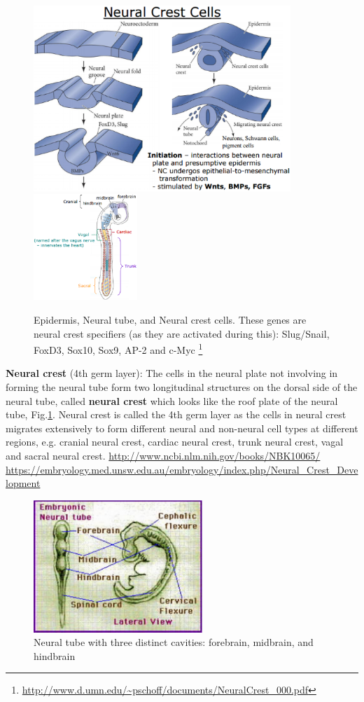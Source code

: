 \begin{figure}[hbt]
  \centerline{
  \includegraphics[height=7cm,
    angle=0]{./images/neural_crest_cells.eps}
  \includegraphics[height=4cm,
    angle=0]{./images/crest_cell_regions.eps}  }
\caption{Epidermis, Neural tube, and Neural crest cells. These genes are neural
crest specifiers (as they are activated during this):
Slug/Snail, FoxD3, Sox10, Sox9, AP-2 and c-Myc
\footnote{\url{http://www.d.umn.edu/~pschoff/documents/NeuralCrest_000.pdf}}}
\label{fig:neural_crest_cells}
\end{figure}

{\bf Neural crest} (4th germ layer): The cells in the neural plate not involving
in forming the neural tube form two longitudinal structures on the dorsal side of the neural
tube, called {\bf neural crest} which looks like the roof plate of the neural
tube, Fig.\ref{fig:neural_crest_cells}.
Neural crest is called the 4th germ layer as the cells in neural crest migrates
extensively to form different neural and non-neural cell types at different
regions, e.g. cranial neural crest, cardiac neural crest, trunk neural crest,
vagal and sacral neural crest.
\url{http://www.ncbi.nlm.nih.gov/books/NBK10065/}
\url{https://embryology.med.unsw.edu.au/embryology/index.php/Neural_Crest_Development}



\begin{figure}[hbt]
  \centerline{
  \includegraphics[height=5cm,
    angle=0]{./images/neural_tube.eps}}
\caption{Neural tube with three distinct cavities: forebrain, midbrain, and
hindbrain}
\label{fig:neural_tube}
\end{figure}
 
